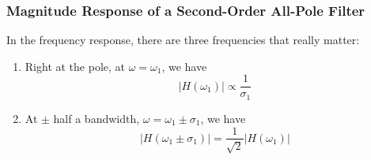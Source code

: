 \documentclass{beamer}
\begin{document}
\begin{frame}
  \frametitle{Magnitude Response of a Second-Order All-Pole Filter}

  In the frequency response, there are three frequencies that really matter:
  \begin{enumerate}
  \item Right at the pole, at $\omega=\omega_1$, we have
    \begin{displaymath}
      |H(\omega_1)| \propto \frac{1}{\sigma_1}
    \end{displaymath}
  \item At $\pm$ half a bandwidth, $\omega=\omega_1\pm\sigma_1$, we have
    \begin{displaymath}
      |H(\omega_1\pm\sigma_1)| =\frac{1}{\sqrt{2}}|H(\omega_1)|
    \end{displaymath}
  \end{enumerate}
\end{frame}  
\end{document}
